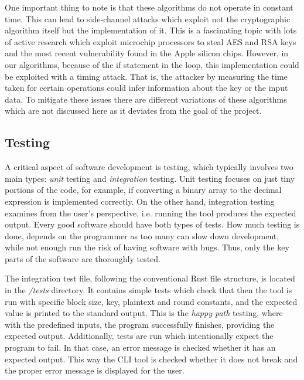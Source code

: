 \documentclass{Resources/UoBLab1}
\theoremstyle{definition}
\begin{document}
One important thing to note is that these algorithms do not operate in constant time. This can lead to side-channel attacks which exploit not the cryptographic algorithm itself but the implementation of it. This is a fascinating topic with lots of active research which exploit microchip processors to steal AES and RSA keys\cite{Spectre} and the most recent vulnerability found in the Apple silicon chips\cite{GoFetch}. However, in our algorithms, because of the if statement in the loop, this implementation could be exploited with a timing attack. That is, the attacker by measuring the time taken for certain operations could infer information about the key or the input data. To mitigate these issues there are different variations of these algorithms which are not discussed here as it deviates from the goal of the project.

\subsection{Testing}
A critical aspect of software development is testing, which typically involves two main types: \textit{unit} testing and \textit{integration} testing. Unit testing focuses on just tiny portions of the code, for example, if converting a binary array to the decimal expression is implemented correctly. On the other hand, integration testing examines from the user's perspective, i.e. running the tool produces the expected output. Every good software should have both types of tests. How much testing is done, depends on the programmer as too many can slow down development, while not enough run the risk of having software with bugs. Thus, only the key parts of the software are thoroughly tested.

The integration test file, following the conventional Rust file structure, is located in the \textit{/tests} directory. It contains simple tests which check that then the tool is run with specific block size, key, plaintext and round constants, and the expected value is printed to the standard output. This is the \textit{happy path} testing, where with the predefined inputs, the program successfully finishes, providing the expected output. Additionally, tests are run which intentionally expect the program to fail. In that case, an error message is checked whether it has an expected output. This way the CLI tool is checked whether it does not break and the proper error message is displayed for the user.
\end{document}
